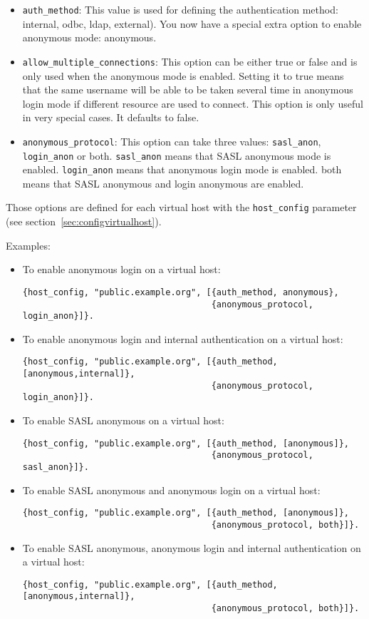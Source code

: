 \documentclass[a4paper,10pt]{article}
\newcommand{\term}[1]{\texttt{#1}}
\begin{document}
\begin{itemize} 
\item \term{auth\_method}: This value is used for defining the authentication method:
internal, odbc, ldap, external). You now have a special extra option to enable
anonymous mode: anonymous.

\item \term{allow\_multiple\_connections}: This option can be either true or false and
is only used when the anonymous mode is enabled. Setting it to true means that
the same username will be able to be taken several time in anonymous login
mode if different resource are used to connect. This option is only useful in
very special cases. It defaults to false.

\item \term{anonymous\_protocol}: This option can take three values:
  \term{sasl\_anon}, \term{login\_anon} or both.  \term{sasl\_anon} means that
  SASL anonymous mode is enabled.  \term{login\_anon} means that anonymous
  login mode is enabled. both means that SASL anonymous and login anonymous are
  enabled.
\end{itemize}

Those options are defined for each virtual host with the \term{host\_config}
parameter (see section~\ref{sec:configvirtualhost}).

Examples:
\begin{itemize}
\item To enable anonymous login on a virtual host:
\begin{verbatim}
{host_config, "public.example.org", [{auth_method, anonymous},
                                     {anonymous_protocol, login_anon}]}.
\end{verbatim}
\item To enable anonymous login and internal authentication on a virtual host:
\begin{verbatim}
{host_config, "public.example.org", [{auth_method, [anonymous,internal]},
                                     {anonymous_protocol, login_anon}]}.
\end{verbatim}
\item To enable SASL anonymous on a virtual host:
\begin{verbatim}
{host_config, "public.example.org", [{auth_method, [anonymous]},
                                     {anonymous_protocol, sasl_anon}]}.
\end{verbatim}
\item To enable SASL anonymous and anonymous login on a virtual host:
\begin{verbatim}
{host_config, "public.example.org", [{auth_method, [anonymous]},
                                     {anonymous_protocol, both}]}.
\end{verbatim}
\item To enable SASL anonymous, anonymous login and internal authentication on
a virtual host:
\begin{verbatim}
{host_config, "public.example.org", [{auth_method, [anonymous,internal]},
                                     {anonymous_protocol, both}]}.
\end{verbatim}
\end{itemize}
\end{document}
